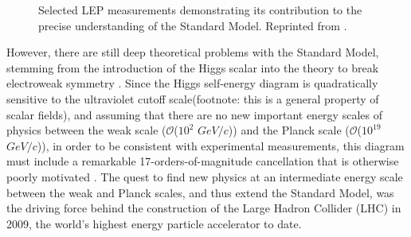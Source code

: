 \documentclass[12pt, letterpaper]{report}
\begin{document}
\begin{figure}
	\label{fig:LEP}
	\caption{Selected LEP measurements demonstrating its contribution to the precise understanding of the Standard Model.  Reprinted from \cite{Drees}.}
\end{figure}

However, there are still deep theoretical problems with the Standard Model, stemming from the introduction of the Higgs scalar into the theory to break electroweak symmetry \cite{Higgs}.  Since the Higgs self-energy diagram is quadratically sensitive to the ultraviolet cutoff scale(footnote: this is a general property of scalar fields), and assuming that there are no new important energy scales of physics between the weak scale ($\mathcal{O}$($10^{2}$ $GeV/c$)) and the Planck scale ($\mathcal{O}$($10^{19}$ $GeV/c$)), in order to be consistent with experimental measurements, this diagram must include a remarkable 17-orders-of-magnitude cancellation that is otherwise poorly motivated \cite{Aitchison}.  The quest to find new physics at an intermediate energy scale between the weak and Planck scales, and thus extend the Standard Model, was the driving force behind the construction of the Large Hadron Collider (LHC) in 2009, the world's highest energy particle accelerator to date.
\end{document}
